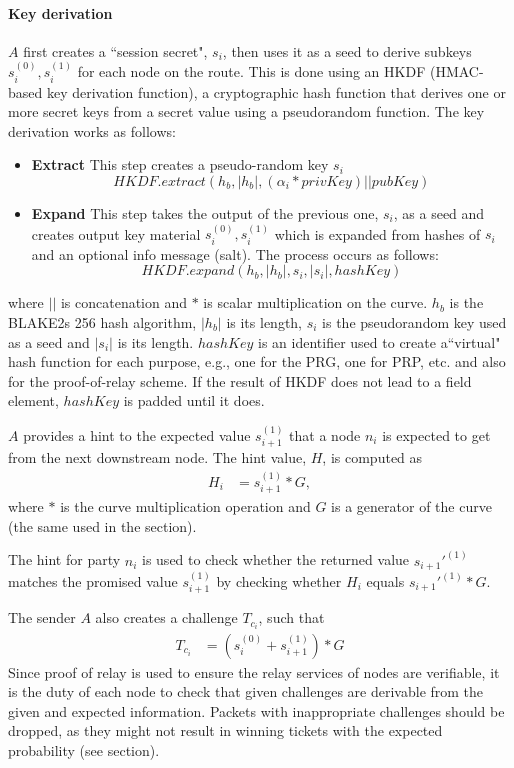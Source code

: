     \paragraph{Key derivation}
    $A$ first creates a ``session secret", $s_i$, then uses it as a seed to derive subkeys $s_i^{(0)},s_i^{(1)}$ for each node on the route. This is done using an HKDF (HMAC-based key derivation function), a cryptographic hash function that derives one or more secret keys from a secret value using a pseudorandom function. The key derivation works as follows:
    \begin{itemize}
        \item \textbf{Extract} This step creates a pseudo-random key $s_i$   
        $$HKDF.extract(h_b, |h_b|, (\alpha_i* privKey) || pubKey)$$   

        \item \textbf{Expand} This step takes the output of the previous one, $s_i$, as a seed and creates output key material $s_i^{(0)},s_i^{(1)}$ which is expanded from hashes of $s_i$ and an optional info message (salt). The process occurs as follows:
        $$HKDF.expand(h_b, |h_b|,s_i, |s_i|, hashKey)$$
    \end{itemize}
    where $||$ is concatenation and $*$ is scalar multiplication on the curve. $h_b$ is the BLAKE2s 256 hash algorithm, $|h_b|$ is its length, $s_i$ is the pseudorandom key used as a seed and $|s_i|$ is its length. $hashKey$ is an identifier used to create a``virtual" hash function for each purpose, e.g., one for the PRG, one for PRP, etc. and also for the proof-of-relay scheme. If the result of HKDF does not lead to a field element, $hashKey$ is padded until it does.
    
$A$ provides a hint to the expected value $s_{i+1}^{(1)}$ that a node $n_i$ is expected to get from the next downstream node.
    The hint value, $H$, is computed as 
    \begin{align}  
        H_i&=s_{i+1}^{(1)}*G,
         \end{align}
    where $*$ is the curve multiplication operation and $G$ is a generator of the curve (the same used in the  section). 
    
The hint for party $n_i$ is used to check whether the returned value $s_{i+1}'^{(1)}$ matches the promised value $s_{i+1}^{(1)}$ by checking whether $H_i$ equals $s_{i+1}'^{(1)}*G$. 
   
The sender $A$ also creates a challenge $T_{c_i}$, such that 
   \begin{align}  
    T_{c_i}&=(s_i^{(0)}+s_{i+1}^{(1)})*G
     \end{align}
   Since proof of relay is used to ensure the relay services of nodes are verifiable, it is the duty of each node to check that given challenges are derivable from the given and expected information.
Packets with inappropriate challenges should be dropped, as they might not result in winning tickets with the expected probability (see  section).

